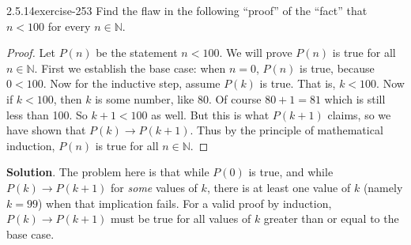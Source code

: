\documentclass[twoside,11pt,]{book}
\numberwithin{equation}{chapter}
\newcommand{\N}{\mathbb N}
\newcommand{\imp}{\rightarrow}
\newcommand{\lt}{<}
\begin{document}
\begin{divisionsolution}{2.5.14}{}{exercise-253}%
\hypertarget{p-3642}{}%
Find the flaw in the following ``proof'' of the ``fact'' that \(n \lt 100\) for every \(n \in \N\).%
\begin{proof}{}
\hypertarget{p-3643}{}%
Let \(P(n)\) be the statement \(n \lt 100\). We will prove \(P(n)\) is true for all \(n \in \N\). First we establish the base case: when \(n = 0\), \(P(n)\) is true, because \(0 \lt 100\). Now for the inductive step, assume \(P(k)\) is true. That is, \(k \lt 100\). Now if \(k \lt 100\), then \(k\) is some number, like 80. Of course \(80+1 = 81\) which is still less than 100. So \(k +1 \lt 100\) as well. But this is what \(P(k+1)\) claims, so we have shown that \(P(k) \imp P(k+1)\). Thus by the principle of mathematical induction, \(P(n)\) is true for all \(n \in \N\).%
\end{proof}
\par\smallskip%
\noindent\textbf{Solution}.\quad%
\hypertarget{p-3644}{}%
The problem here is that while \(P(0)\) is true, and while \(P(k) \imp P(k+1)\) for \emph{some} values of \(k\), there is at least one value of \(k\) (namely \(k = 99\)) when that implication fails. For a valid proof by induction, \(P(k) \imp P(k+1)\) must be true for all values of \(k\) greater than or equal to the base case.%
\end{divisionsolution}%
\end{document}
